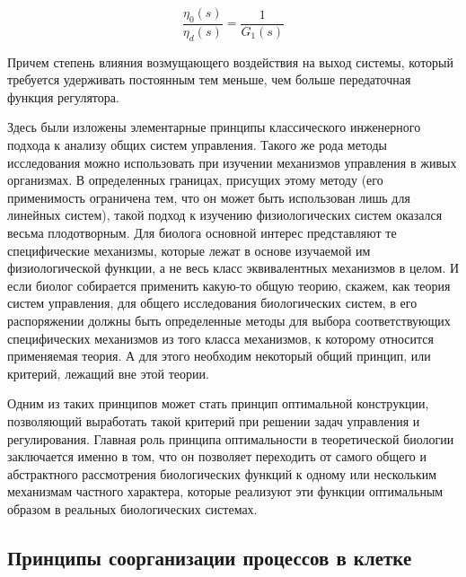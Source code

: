 \documentclass[12pt,a4paper,oneside]{book}
\begin{document}
$$ \frac {\eta_0 (s)} {\eta_d(s)} = \frac 1 {G_1(s)}$$

Причем степень влияния возмущающего воздействия на выход системы, который требуется удерживать постоянным тем меньше, чем больше передаточная функция регулятора. 

Здесь были изложены элементарные принципы классического инженерного подхода к анализу общих систем управления. Такого же рода методы исследования можно использовать при изучении механизмов управления в живых организмах. В определенных границах, присущих этому методу (его применимость ограничена тем, что он может быть использован лишь для линейных систем), такой подход к изучению физиологических систем оказался весьма плодотворным. Для биолога основной интерес представляют те специфические механизмы, которые лежат в основе изучаемой им физиологической функции, а не весь класс эквивалентных механизмов в целом. И если биолог собирается применить какую-то общую теорию, скажем, как теория систем управления, для общего исследования биологических систем, в его распоряжении должны быть определенные методы для выбора соответствующих специфических механизмов из того класса механизмов, к которому относится применяемая теория. А для этого необходим некоторый общий принцип, или критерий, лежащий вне этой теории.

Одним из таких принципов может стать принцип оптимальной конструкции, позволяющий выработать такой критерий при решении задач управления и регулирования. Главная роль принципа оптимальности в теоретической биологии заключается именно в том, что он позволяет переходить от самого общего и абстрактного рассмотрения биологических функций к одному или нескольким механизмам частного характера, которые реализуют эти функции оптимальным образом в реальных биологических системах.


\subsection{Принципы соорганизации процессов в клетке}
\end{document}
